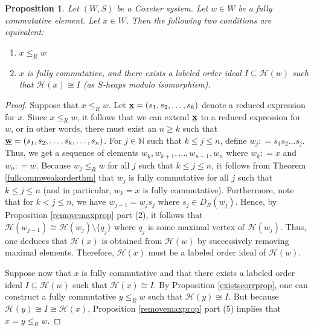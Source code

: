 \documentclass{amsart}
\theoremstyle{plain} %
\newtheorem{prop}[thm]{Proposition}
\theoremstyle{definition}
\def\weakr{\leq_{R}}
\def\N{\mathbb{N}}
\def\H#1{\mathcal{H}(#1)}
\begin{document}
\begin{prop} \label{equividealprop}
    Let $ (W,S)$ be a Coxeter system. Let $ w\in W$ be a fully commutative element. Let $x\in W $. Then the following two conditions are equivalent:

    \begin{enumerate}
        \item $ x \weakr w$

        \item $ x$ is fully commutative, and there exists a labeled order ideal $ I \subseteq \H{w}$ such that $ \H{x} \cong I$ (as $S$-heaps modulo isomorphism).
    \end{enumerate}
\end{prop}

\begin{proof}
    Suppose that $ x \weakr w$. Let $ \textbf{\underline{x}} = (s_{1}, s_{2}, \dots , s_{k})$ denote a reduced expression for $ x$. Since $ x\weakr w$, it follows that we can extend $\textbf{\underline{x}}$ to a reduced expression for $w$, or in other words, there must exist an $n \geq k$ such that $ \textbf{\underline{w}} = (s_{1}, s_{2}, \dots , s_{k}, \dots, s_{n})$. For $ j \in \N$ such that $ k \leq j \leq n$, define $ w_{j} : = s_{1}s_{2} \dots s_{j}$. Thus, we get a sequence of elements $ w_{k}, w_{k+1}, \dots , w_{n-1}, w_{n}$ where $w_{k} : = x$ and $ w_{n}: = w$. Because $ w_{j} \weakr w$ for all $ j$ such that $ k \leq j \leq n$, it follows from Theorem \ref{fullcommweakorderthm} that $ w_{j}$ is fully commutative for all $ j$ such that $ k \leq j \leq n$ (and in particular, $ w_{k} = x$ is fully commutative). Furthermore, note that for $ k < j \leq n$, we have $ w_{j-1} = w_{j}s_{j}$ where $ s_{j} \in D_{R}(w_{j})$. Hence, by Proposition \ref{removemaxprop} part (2), it follows that $ \H{w_{j-1}} \cong \H{w_{j}} \setminus \{  q_{j} \}$ where $ q_{j}$ is some maximal vertex of $ \H{w_{j}}$. Thus, one deduces that $ \H{x}$ is obtained from $ \H{w}$ by successively removing maximal elements. Therefore, $ \H{x}$ must be a labeled order ideal of $ \H{w}$.

    Suppose now that $ x$ is fully commutative and that there exists a labeled order ideal $ I \subseteq \H{w}$ such that $ \H{x} \cong I$. By Proposition \ref{existscorrprop}, one can construct a fully commutative $y \weakr w$ such that $ \H{y} \cong I$. But because $ \H{y} \cong I \cong \H{x}$, Proposition \ref{removemaxprop} part (5) implies that $ x = y\weakr w$.
\end{proof}
\end{document}
